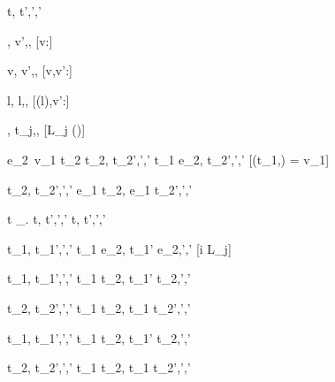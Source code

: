 

  {t,\sigma {} t',\sigma',\delta'}



  { }
  {\Enter \tau,\sigma {} \Update v',\sigma,\nothing}
  [v:\beta]

  { }
  {\Update v,\sigma {} \Update v',\sigma,\nothing}
  [v,v':\beta]

  { }
  {\Change l,\sigma {} \Change l,\sigma[l \mapsto v'],}
  [\sigma(l),v':\beta]



	{ }
	{\Pick{},\sigma {} t_j,\sigma,\nothing}
  [L_j \in \Picks(\Pick{})]



	{e_2\ v_1 \eval t_2 \Quad
   t_2,\sigma {} t_2',\sigma',\delta'}
  {t_1 \Step e_2,\sigma {} t_2',\sigma',\delta'}
  [\Value(t_1,\sigma) = v_1]



	{t_2,\sigma {} t_2',\sigma',\delta'}
	{e_1 \Trans t_2,\sigma {} e_1 \Trans t_2',\sigma',\delta'}

  {t \Step \lambda\_. \Forever t,\sigma {} t',\sigma',\delta'}
  {\Forever t,\sigma {} t',\sigma',\delta'}

  {t_1,\sigma {} t_1',\sigma',\delta'}
  {t_1 \Step e_2,\sigma {} t_1' \Step e_2,\sigma',\delta'}
  [i \neq \IContinue L_j]

  {t_1,\sigma {} t_1',\sigma',\delta'}
  {t_1 \Pair t_2,\sigma {} t_1' \Pair t_2,\sigma',\delta'}

  {t_2,\sigma {} t_2',\sigma',\delta'}
  {t_1 \Pair t_2,\sigma {} t_1 \Pair t_2',\sigma',\delta'}

  {t_1,\sigma {} t_1',\sigma',\delta'}
  {t_1 \Choose t_2,\sigma {} t_1' \Choose t_2,\sigma',\delta'}

  {t_2,\sigma {} t_2',\sigma',\delta'}
  {t_1 \Choose t_2,\sigma {} t_1 \Choose t_2',\sigma',\delta'}


